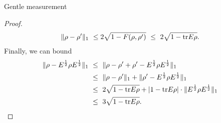 \begin{subsubsection}{Gentle measurement}
\begin{proof}
\begin{align}
         \|\rho - \rho'\|_1 \ \leq 2 \sqrt{1 - F(\rho,\rho')} \ \leq \ 2 \sqrt{1 - \mathrm{tr} E \rho}.
        \end{align}
        Finally, we can bound
        \begin{align}
         \|\rho - E^{\frac{1}{2}}\rho E^{\frac{1}{2}}\|_1 
         \ &\leq \ \|\rho - \rho' + \rho' -E^{\frac{1}{2}}\rho E^{\frac{1}{2}}\|_1 \\
         \ &\leq \ \|\rho - \rho'\|_1 + \|\rho' -E^{\frac{1}{2}}\rho E^{\frac{1}{2}}\|_1 \\
         \ & \leq \ 2 \sqrt{1 - \mathrm{tr} E \rho} + |1 - \mathrm{tr} E \rho | \cdot \|E^{\frac{1}{2}}\rho E^{\frac{1}{2}}  \|_1 \\
         \ & \leq \ 3 \sqrt{1 - \mathrm{tr} E \rho}.
        \end{align}
        \end{proof}


\end{subsubsection}
